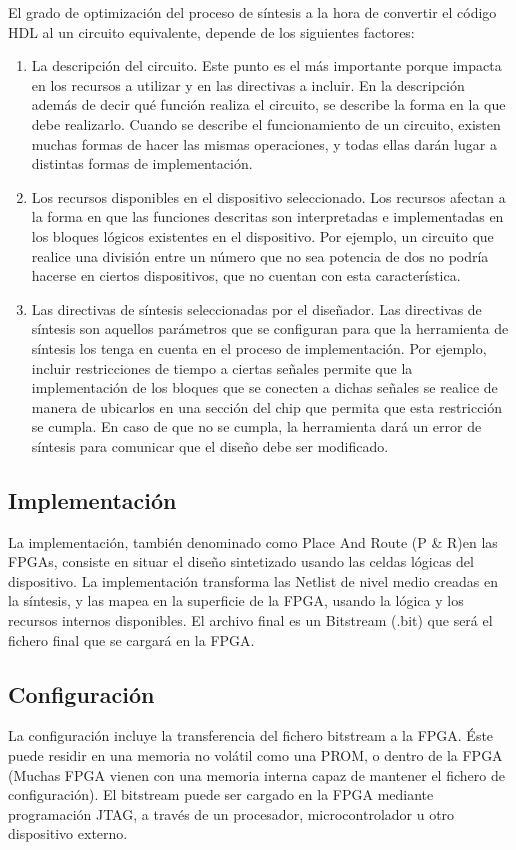 El grado de optimización del proceso de síntesis a la hora de convertir el código HDL al un circuito equivalente, depende de los siguientes factores:
\begin{enumerate}
\item La descripción del circuito.
Este punto es el más importante porque impacta en los recursos a utilizar y en las directivas a incluir. En la descripción además de decir qué función realiza el circuito, se describe la forma en la que debe realizarlo. Cuando se describe el funcionamiento de un circuito, existen muchas formas de hacer las mismas operaciones, y todas ellas darán lugar a distintas formas de implementación.

\item Los recursos disponibles en el dispositivo seleccionado.
Los recursos afectan a la forma en que las funciones descritas son interpretadas e implementadas en los bloques lógicos existentes en el dispositivo. Por ejemplo, un circuito que realice una división entre un número que no sea potencia de dos no podría hacerse en ciertos dispositivos, que no cuentan con esta característica.

\item Las directivas de síntesis seleccionadas por el diseñador.
Las directivas de síntesis son aquellos parámetros que se configuran para que la herramienta de síntesis los tenga en cuenta en el proceso de implementación. Por ejemplo, incluir restricciones de tiempo a ciertas señales permite que la implementación de los bloques que se conecten a dichas señales se realice de manera de ubicarlos en una sección del chip que permita que esta restricción se cumpla. En caso de que no se cumpla, la herramienta dará un error de síntesis para comunicar que el diseño debe ser modificado.
\end{enumerate}


\subsection{Implementación}
La implementación, también denominado como Place And Route (P \& R)en las FPGAs, consiste en situar el diseño sintetizado usando las celdas lógicas del dispositivo. La implementación transforma las Netlist de nivel medio creadas en la síntesis, y las mapea en la superficie de la FPGA, usando la lógica y los recursos internos disponibles. El archivo final es un Bitstream (.bit) que será el fichero final que se cargará en la FPGA.

\subsection{Configuración}
La configuración incluye la transferencia del fichero bitstream a la FPGA. Éste puede residir en una memoria no volátil como una PROM, o dentro de la FPGA (Muchas FPGA vienen con una memoria  interna capaz de mantener el fichero de configuración). El bitstream puede ser cargado en la FPGA mediante programación JTAG, a través de un procesador, microcontrolador u otro dispositivo externo.
